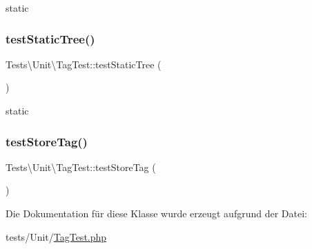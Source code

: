 static \mbox{\label{classTests_1_1Unit_1_1TagTest_ae00b6cae6388bdabf451ec6af082687b}} 
\subsubsection{\texorpdfstring{test\+Static\+Tree()}{testStaticTree()}}
{\footnotesize\ttfamily Tests\textbackslash{}\+Unit\textbackslash{}\+Tag\+Test\+::test\+Static\+Tree (\begin{DoxyParamCaption}{ }\end{DoxyParamCaption})}

static \mbox{\label{classTests_1_1Unit_1_1TagTest_a8edae443cbd67050d4f35a0023356f53}} 
\subsubsection{\texorpdfstring{test\+Store\+Tag()}{testStoreTag()}}
{\footnotesize\ttfamily Tests\textbackslash{}\+Unit\textbackslash{}\+Tag\+Test\+::test\+Store\+Tag (\begin{DoxyParamCaption}{ }\end{DoxyParamCaption})}



Die Dokumentation für diese Klasse wurde erzeugt aufgrund der Datei\+:\begin{DoxyCompactItemize}
\item 
tests/\+Unit/\hyperlink{TagTest_8php}{Tag\+Test.\+php}\end{DoxyCompactItemize}
